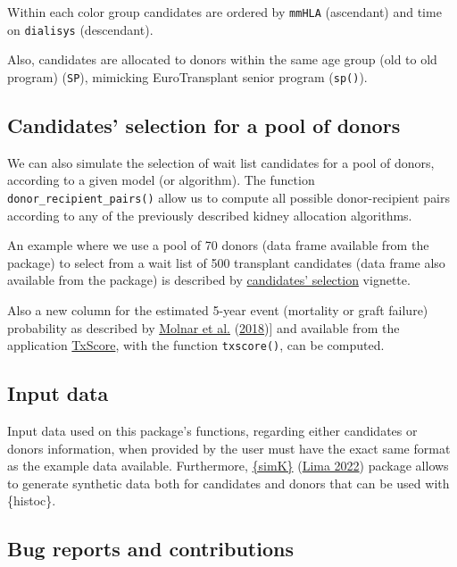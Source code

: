 \documentclass[
]{article}
\begin{document}
Within each color group candidates are ordered by \texttt{mmHLA}
(ascendant) and time on \texttt{dialisys} (descendant).

Also, candidates are allocated to donors within the same age group (old
to old program) (\texttt{SP}), mimicking EuroTransplant senior program
(\texttt{sp()}).

\hypertarget{candidates-selection-for-a-pool-of-donors}{%
\subsection{Candidates' selection for a pool of
donors}\label{candidates-selection-for-a-pool-of-donors}}

We can also simulate the selection of wait list candidates for a pool of
donors, according to a given model (or algorithm). The function
\texttt{donor\_recipient\_pairs()} allow us to compute all possible
donor-recipient pairs according to any of the previously described
kidney allocation algorithms.

An example where we use a pool of 70 donors (data frame available from
the package) to select from a wait list of 500 transplant candidates
(data frame also available from the package) is described by
\href{https://txopen.github.io/histoc/articles/cand_select.html}{candidates'
selection} vignette.

Also a new column for the estimated 5-year event (mortality or graft
failure) probability as described by
\protect\hyperlink{ref-Molnar:2018}{Molnar et al.}
(\protect\hyperlink{ref-Molnar:2018}{2018}){]} and available from the
application \href{https://balima.shinyapps.io/scoreTx/}{TxScore}, with
the function \texttt{txscore()}, can be computed.

\hypertarget{input-data}{%
\subsection{Input data}\label{input-data}}

Input data used on this package's functions, regarding either candidates
or donors information, when provided by the user must have the exact
same format as the example data available. Furthermore,
\href{https://github.com/txopen/simK}{\{simK\}}
(\protect\hyperlink{ref-simK}{Lima 2022}) package allows to generate
synthetic data both for candidates and donors that can be used with
\{histoc\}.

\hypertarget{bug-reports-and-contributions}{%
\subsection{Bug reports and
contributions}\label{bug-reports-and-contributions}}
\end{document}
